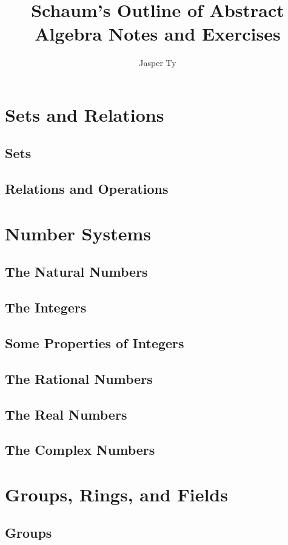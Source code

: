 \documentclass{book}
\begin{document}
\title{Schaum's Outline of Abstract Algebra Notes and Exercises}
\author{Jasper Ty}
\date{}
\maketitle

\tableofcontents

\part{Sets and Relations}
\chapter{Sets}


\chapter{Relations and Operations}

\part{Number Systems}
\chapter{The Natural Numbers}
\chapter{The Integers}
\chapter{Some Properties of Integers}
\chapter{The Rational Numbers}
\chapter{The Real Numbers}
\chapter{The Complex Numbers}

\part{Groups, Rings, and Fields}
\chapter{Groups}

\end{document}
